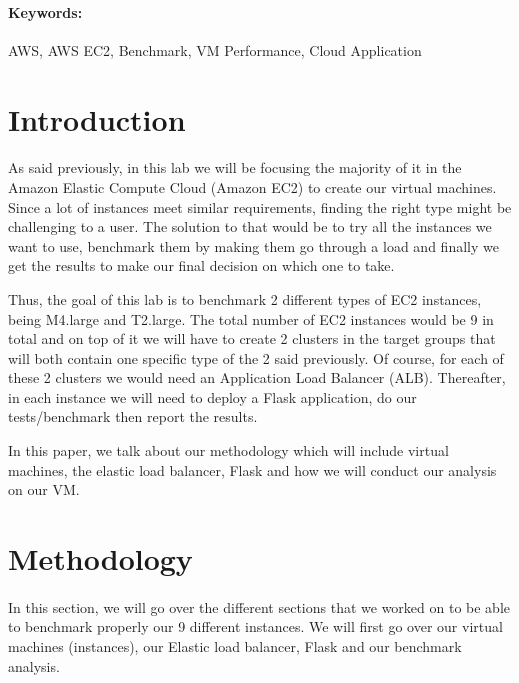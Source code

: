 \documentclass[12pt]{article}
\begin{document}
	\paragraph{Keywords:}AWS, AWS EC2, Benchmark, VM Performance, Cloud Application
	\pagebreak

\section{Introduction} \label{sec:introduction}
	\paragraph{} As said previously, in this lab we will be focusing the majority of
	it in the Amazon Elastic Compute Cloud (Amazon EC2) to create our virtual machines.
	Since a lot of instances meet similar requirements, finding the right type might be
	challenging to a user. The solution to that would be to try all the instances we want 
	to use, benchmark them by making them go through a load and finally we get the results 
	to make our final decision on which one to take.
	\cite{1}\bigskip

	Thus, the goal of this lab is to benchmark 2 different types of EC2 instances, being 
	M4.large and T2.large. The total number of EC2 instances would be 9 in total and on top 
	of it we will have to create 2 clusters in the target groups that will both contain one 
	specific type of the 2 said previously. Of course, for each of these 2 clusters we would 
	need an Application Load Balancer (ALB). Thereafter, in each instance we will need to deploy 
	a Flask application, do our tests/benchmark then report the results.
	\bigskip

	In this paper, we talk about our methodology which will include virtual machines, the elastic 
	load balancer, Flask and how we will conduct our analysis on our VM.
	\bigskip

	\pagebreak


\section{Methodology} \label{sec:methodology}
	\paragraph{} In this section, we will go over the different sections that we 
	worked on to be able to benchmark properly our 9 different instances. We will first
	go over our virtual machines (instances), our  Elastic load balancer, Flask and 
	our benchmark analysis. \bigskip
\end{document}
